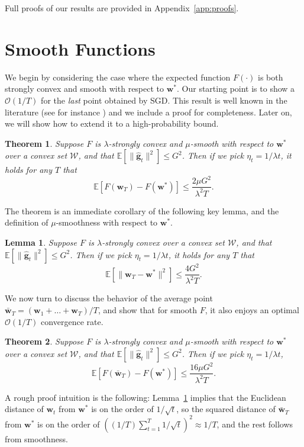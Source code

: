 \documentclass{article}
\newtheorem{theorem}{Theorem}
\newtheorem{lemma}{Lemma}
\newcommand{\E}{\mathbb{E}}
\newcommand{\bw}{\mathbf{w}}
\newcommand{\bg}{\mathbf{g}}
\newcommand{\Ocal}{\mathcal{O}}
\newcommand{\Wcal}{\mathcal{W}}
\newcommand{\norm}[1]{\|#1\|}
\newcommand{\lemref}[1]{Lemma~\ref{#1}}
\newcommand{\appref}[1]{Appendix~\ref{#1}}
\begin{document}
Full proofs of our results are provided in \appref{app:proofs}.

\section{Smooth Functions}\label{sec:smooth}

We begin by considering the case where the expected function $F(\cdot)$ is both strongly convex and smooth with respect to $\bw^*$. Our starting point is to show a $\Ocal(1/T)$ for the \emph{last} point obtained by SGD. This result is well known in the literature (see for instance \cite{JuLaNeSha09}) and we include a proof for completeness. Later on, we will
show how to extend it to a high-probability bound.

\begin{theorem}\label{thm:last}
Suppose $F$ is $\lambda$-strongly convex and $\mu$-smooth with respect to $\bw^*$ over a convex set $\Wcal$, and that $\E[\norm{\hat{\bg}_t}^2]\leq G^2$. Then if we pick $\eta_t = 1/\lambda t$, it holds for any $T$ that
\[
\E[F(\bw_T)-F(\bw^{*})] \leq \frac{2\mu G^2}{\lambda^2 T}.
\]
\end{theorem}
The theorem is an immediate corollary of the following key lemma, and the definition of $\mu$-smoothness with respect to $\bw^*$.
\begin{lemma}\label{lem:close}
Suppose $F$ is $\lambda$-strongly convex over a convex set $\Wcal$, and that $\E[\norm{\hat{\bg}_t}^2]\leq G^2$. Then if we pick $\eta_t = 1/\lambda t$, it holds for any $T$ that
\[
\E\left[\norm{\bw_T-\bw^{*}}^2\right] \leq \frac{4 G^2}{\lambda^2 T}.
\]
\end{lemma}

We now turn to discuss the behavior of the average point $\bar{\bw}_T= (\bw_1+\ldots+\bw_T)/T$, and show that for smooth $F$, it also enjoys an optimal $\Ocal(1/T)$ convergence rate.

\begin{theorem}\label{thm:average}
Suppose $F$ is $\lambda$-strongly convex and $\mu$-smooth with respect to $\bw^*$ over a convex set $\Wcal$, and that $\E[\norm{\hat{\bg}_t}^2]\leq G^2$. Then if we pick $\eta_t = 1/\lambda t$,
\[
\E[F(\bar{\bw}_T)-F(\bw^{*})] \leq \frac{16 \mu G^2}{\lambda^2 T}.
\]
\end{theorem}
A rough proof intuition is the following: \lemref{lem:close} implies that the Euclidean distance of $\bw_t$ from $\bw^{*}$ is on the order of $1/\sqrt{t}$, so the squared distance of $\bar{\bw}_T$ from $\bw^{*}$ is on the order of $((1/T)\sum_{t=1}^{T}1/\sqrt{t})^2 \approx 1/T$, and the rest follows from smoothness.
\end{document}
